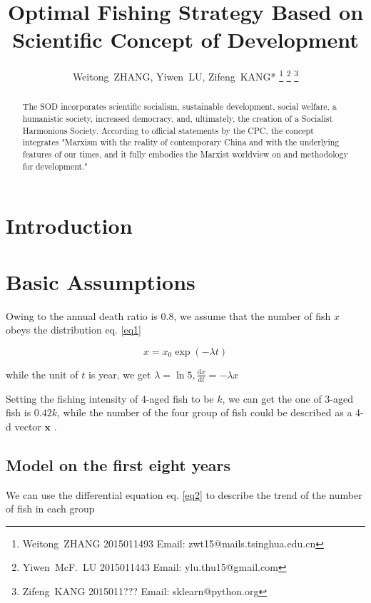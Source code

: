 \renewcommand{\IEEEQED}{\IEEEQEDclosed}
\title{Optimal Fishing Strategy Based on Scientific Concept of Development}
\author{
    Weitong~ZHANG, Yiwen~LU, Zifeng~KANG*
    \thanks{Weitong~ZHANG 2015011493 Email: zwt15@mails.tsinghua.edu.cn}
    \thanks{Yiwen~McF.~LU 2015011443 Email: ylu.thu15@gmail.com}
    \thanks{Zifeng~KANG 2015011??? Email: sklearn@python.org}
}

\maketitle

\begin{abstract}
    The SOD incorporates scientific socialism, sustainable development, social welfare, a humanistic society, increased democracy, and, ultimately, the creation of a Socialist Harmonious Society. According to official statements by the CPC, the concept integrates "Marxism with the reality of contemporary China and with the underlying features of our times, and it fully embodies the Marxist worldview on and methodology for development."
\end{abstract}

\section{Introduction}
\section{Basic Assumptions}


Owing to the annual death ratio is 0.8, we assume that the number of fish $x$ obeys the distribution eq. \ref{eq1}

\begin{equation}
    \label{eq1}
    x = x_0 \exp(-\lambda t)
\end{equation}

while the unit of $t$ is year, we get $\lambda = \ln 5, \frac{\mathrm dx}{\mathrm dt} = -\lambda x$

Setting the fishing intensity of 4-aged fish to be $k$, we can get the one of 3-aged fish is $0.42k$, while the number of the four group of fish could be described as a 4-d vector $\bm x$ .

\subsection{Model on the first eight years}

We can use the differential equation eq. \ref{eq2} to describe the trend of the number of fish in each group

